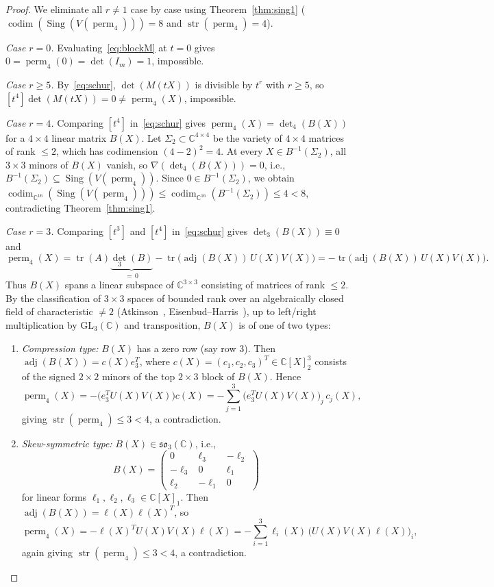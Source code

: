 \documentclass[11pt,a4paper]{article}
\theoremstyle{definition}
\DeclareMathOperator{\perm}{perm}
\DeclareMathOperator{\codim}{codim}
\DeclareMathOperator{\Sing}{Sing}
\DeclareMathOperator{\str}{str}
\DeclareMathOperator{\tr}{tr}
\DeclareMathOperator{\adj}{adj}
\begin{document}
\begin{proof}
We eliminate all $r \neq 1$ case by case using Theorem~\ref{thm:sing1} ($\codim(\Sing(V(\perm_4))) = 8$ and $\str(\perm_4) = 4$).

\emph{Case $r = 0$.} Evaluating~\eqref{eq:blockM} at $t = 0$ gives $0 = \perm_4(0) = \det(I_m) = 1$, impossible.

\emph{Case $r \ge 5$.} By~\eqref{eq:schur}, $\det(M(tX))$ is divisible by $t^r$ with $r \ge 5$, so $[t^4]\det(M(tX)) = 0 \neq \perm_4(X)$, impossible.

\emph{Case $r = 4$.} Comparing $[t^4]$ in~\eqref{eq:schur} gives $\perm_4(X) = \det_4(B(X))$ for a $4\times 4$ linear matrix $B(X)$. Let $\Sigma_2 \subset \mathbb{C}^{4\times 4}$ be the variety of $4\times 4$ matrices of rank $\le 2$, which has codimension $(4-2)^2 = 4$. At every $X \in B^{-1}(\Sigma_2)$, all $3\times 3$ minors of $B(X)$ vanish, so $\nabla(\det_4(B(X))) = 0$, i.e., $B^{-1}(\Sigma_2) \subseteq \Sing(V(\perm_4))$. Since $0 \in B^{-1}(\Sigma_2)$, we obtain $\codim_{\mathbb{C}^{16}}(\Sing(V(\perm_4))) \le \codim_{\mathbb{C}^{16}}(B^{-1}(\Sigma_2)) \le 4 < 8$, contradicting Theorem~\ref{thm:sing1}.

\emph{Case $r = 3$.} Comparing $[t^3]$ and $[t^4]$ in~\eqref{eq:schur} gives $\det_3(B(X)) \equiv 0$ and
\[
  \perm_4(X) = \tr(A)\underbrace{\det_3(B)}_{=\,0} - \tr\!\big(\adj(B(X))\, U(X) V(X)\big)
  = -\tr\!\big(\adj(B(X))\, U(X) V(X)\big).
\]
Thus $B(X)$ spans a linear subspace of $\mathbb{C}^{3\times 3}$ consisting of matrices of rank $\le 2$. By the classification of $3 \times 3$ spaces of bounded rank over an algebraically closed field of characteristic $\neq 2$ (Atkinson~\cite{Atkinson1983}, Eisenbud--Harris~\cite{EH1988}), up to left/right multiplication by $\mathrm{GL}_3(\mathbb{C})$ and transposition, $B(X)$ is of one of two types:
\begin{enumerate}
  \item \emph{Compression type:} $B(X)$ has a zero row (say row $3$). Then $\adj(B(X)) = c(X) e_3^T$, where $c(X) = (c_1,c_2,c_3)^T \in \mathbb{C}[X]_2^3$ consists of the signed $2\times 2$ minors of the top $2\times 3$ block of $B(X)$. Hence
  \[
    \perm_4(X) = -\big(e_3^T U(X) V(X)\big) c(X) = -\sum_{j=1}^3 \big(e_3^T U(X) V(X)\big)_j\, c_j(X),
  \]
  giving $\str(\perm_4) \le 3 < 4$, a contradiction.
  \item \emph{Skew-symmetric type:} $B(X) \in \mathfrak{so}_3(\mathbb{C})$, i.e.,
  \[
    B(X) = \begin{pmatrix} 0 & \ell_3 & -\ell_2 \\ -\ell_3 & 0 & \ell_1 \\ \ell_2 & -\ell_1 & 0 \end{pmatrix}
  \]
  for linear forms $\ell_1,\ell_2,\ell_3 \in \mathbb{C}[X]_1$. Then $\adj(B(X)) = \ell(X)\ell(X)^T$, so
  \[
    \perm_4(X) = -\ell(X)^T U(X) V(X) \ell(X) = -\sum_{i=1}^3 \ell_i(X)\, \big(U(X) V(X) \ell(X)\big)_i,
  \]
  again giving $\str(\perm_4) \le 3 < 4$, a contradiction.
\end{enumerate}


\end{proof}
\end{document}
